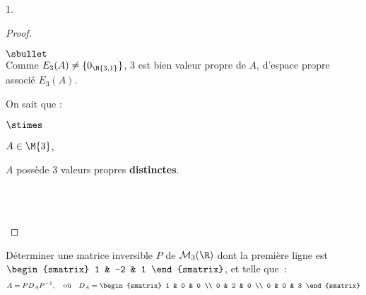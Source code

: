 \documentclass[11pt]{article}%
\begin{document}
\begin{noliste}{1.}
\begin{proof}
\begin{noliste}{$\sbullet$}
\[   \]  
   Comme $E_3(A) \neq \{0_{\M{3,1}}\}$, $3$ est bien valeur propre de
   $A$, d'espace propre associé $E_3(A)$.%
   
  



 \item On sait que :
  \begin{noliste}{$\stimes$}
    \item $A\in \M{3}$,
    \item $A$ possède $3$ valeurs propres {\bf distinctes}.
  \end{noliste}
  ~\\[-1cm]
 \end{noliste}
  ~\\[-1.4cm]
 \end{proof}
 
\item Déterminer une matrice inversible $P$ de $\mathcal{M}_3(\R)$
  dont la première ligne est $\begin{smatrix} 1 & -2 & 1
  \end{smatrix}$, et telle que~:
  \[ 
  A = P D_A P^{-1}, \quad \text{où} \quad D_A = 
  \begin{smatrix} 
    1 & 0 & 0 \\ 
    0 & 2 & 0 \\ 
    0 & 0 & 3 
  \end{smatrix} 
  \]
  

\end{noliste}
\end{document}

